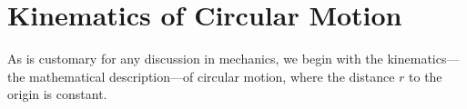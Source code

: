 %
%


\section{Kinematics of Circular Motion}

As is customary for any discussion in mechanics, we begin with the
kinematics---the mathematical description---of circular motion, where the
distance $r$ to the origin is constant.

